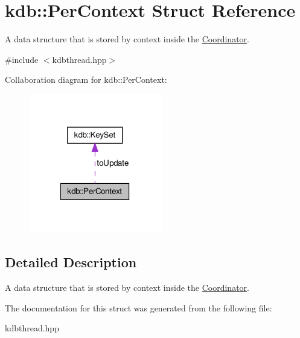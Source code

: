 \hypertarget{structkdb_1_1PerContext}{\section{kdb\-:\-:Per\-Context Struct Reference}
\label{structkdb_1_1PerContext}
}


A data structure that is stored by context inside the \hyperlink{classkdb_1_1Coordinator}{Coordinator}.  




{\ttfamily \#include $<$kdbthread.\-hpp$>$}



Collaboration diagram for kdb\-:\-:Per\-Context\-:
\nopagebreak
\begin{figure}[H]
\begin{center}
\leavevmode
\includegraphics[width=165pt]{structkdb_1_1PerContext__coll__graph}
\end{center}
\end{figure}


\subsection{Detailed Description}
A data structure that is stored by context inside the \hyperlink{classkdb_1_1Coordinator}{Coordinator}. 

The documentation for this struct was generated from the following file\-:\begin{DoxyCompactItemize}
\item 
kdbthread.\-hpp\end{DoxyCompactItemize}
